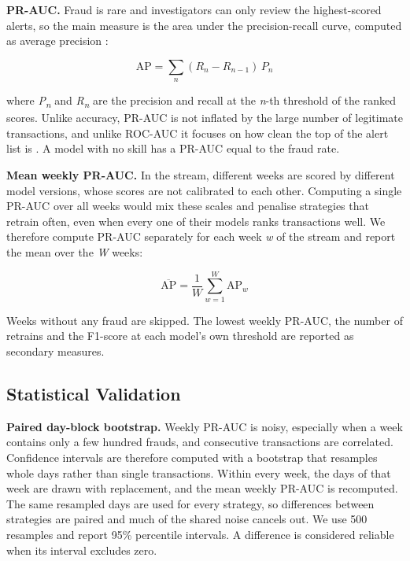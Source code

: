 \textbf{PR-AUC.} Fraud is rare and investigators can only review the highest-scored alerts, so the main measure is the area under the precision-recall curve, computed as average precision \cite{dalpozzolo2018}:

\begin{equation}
  \mathrm{AP} = \sum_{n} (R_n - R_{n-1})\,P_n
  \label{eq:ap}
\end{equation}

where \textit{P\textsubscript{n}} and \textit{R\textsubscript{n}} are the precision and recall at the \textit{n}-th threshold of the ranked scores. Unlike accuracy, PR-AUC is not inflated by the large number of legitimate transactions, and unlike ROC-AUC it focuses on how clean the top of the alert list is \cite{abdelnaby2023}. A model with no skill has a PR-AUC equal to the fraud rate.

\textbf{Mean weekly PR-AUC.} In the stream, different weeks are scored by different model versions, whose scores are not calibrated to each other. Computing a single PR-AUC over all weeks would mix these scales and penalise strategies that retrain often, even when every one of their models ranks transactions well. We therefore compute PR-AUC separately for each week \textit{w} of the stream and report the mean over the \textit{W} weeks:

\begin{equation}
  \overline{\mathrm{AP}} = \frac{1}{W} \sum_{w=1}^{W} \mathrm{AP}_w
  \label{eq:weekly}
\end{equation}

Weeks without any fraud are skipped. The lowest weekly PR-AUC, the number of retrains and the F1-score at each model's own threshold are reported as secondary measures.

\subsection{Statistical Validation}\label{sec:validation}

\textbf{Paired day-block bootstrap.} Weekly PR-AUC is noisy, especially when a week contains only a few hundred frauds, and consecutive transactions are correlated. Confidence intervals are therefore computed with a bootstrap that resamples whole days rather than single transactions. Within every week, the days of that week are drawn with replacement, and the mean weekly PR-AUC is recomputed. The same resampled days are used for every strategy, so differences between strategies are paired and much of the shared noise cancels out. We use 500 resamples and report 95\% percentile intervals. A difference is considered reliable when its interval excludes zero.

